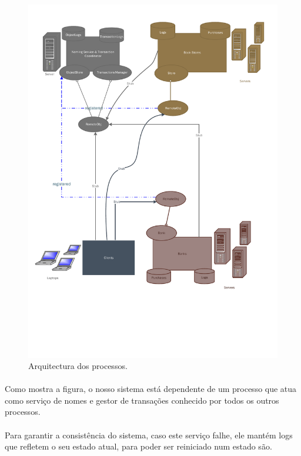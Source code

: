 \documentclass[11pt,a4paper]{report}
\begin{document}
\begin{figure}[H]
  \centering
  \includegraphics[scale=0.80,page=1]{Process_Architecture.pdf}
  \caption{Arquitectura dos processos.}
  \label{fig:procarq}
\end{figure}
\newpage

\paragraph{}Como mostra a figura, o nosso sistema está dependente de um processo que atua como serviço de nomes e gestor de transações conhecido por todos os outros processos.

\paragraph{}Para garantir a consistência do sistema, caso este serviço falhe, ele mantém logs que refletem o seu estado atual, para poder ser reiniciado num estado são.
\end{document}
